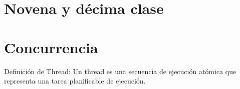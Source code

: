 \documentclass[titlepage,a4paper]{article}
\begin{document}
% 
%
%
%
% 
%

\newpage

\section*{Novena y décima clase}
\section{Concurrencia}
Definición de Thread: Un thread es una secuencia de ejecución atómica que representa una tarea planificable de ejecución.
\end{document}
